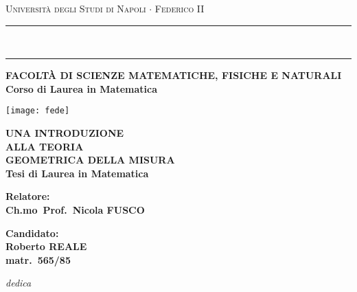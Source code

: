 \documentclass[a4paper,10pt,openright,oneside]{book}
\theoremstyle{theoremstyle}
\theoremstyle{theoremstylewoheader}
\theoremstyle{theoremstyle}
\theoremstyle{proofsecstyle}
\theoremstyle{nonumberplain}
\begin{document}


\begin{titlepage}
\begin{center}
{\LARGE{\textsc{Universit\`a degli Studi di Napoli $\cdot$ Federico II}}}
\rule[0.1cm]{\textwidth}{0.1mm}\\\rule[0.5cm]{\textwidth}{0.6mm}
{\large{\bf FACOLT\`A DI SCIENZE MATEMATICHE, FISICHE E NATURALI\\
\vspace{1mm}Corso di Laurea in Matematica}}
\end{center}
\vspace{3mm}
\begin{center}
\texttt{[image: fede]}
\end{center}
\vspace{5mm}
\begin{center}
{\Huge{\bf UNA INTRODUZIONE}}\\
\vspace{3mm}
{\Huge{\bf ALLA TEORIA}}\\
\vspace{3mm}
{\Huge{\bf GEOMETRICA DELLA MISURA}}\\
\vspace{10mm} {\LARGE{\bf Tesi di Laurea in Matematica}}%
\end{center}
\vfill
\par
\noindent
\begin{minipage}[t]{0.47\textwidth}
{\large{\bf Relatore:\\
Ch.mo~Prof.~Nicola FUSCO}}
\end{minipage}
\hfill
\begin{minipage}[t]{0.47\textwidth}\raggedleft
{\large{\bf Candidato:\\
Roberto REALE\\
matr.~565/85}}
\end{minipage}
\end{titlepage}


\cleardoublepage\thispagestyle{empty}\mbox{} %
\cleardoublepage\thispagestyle{empty}
\null{}
\begin{flushright}
\emph{\Large dedica}
\end{flushright}
\null %
\end{document}
